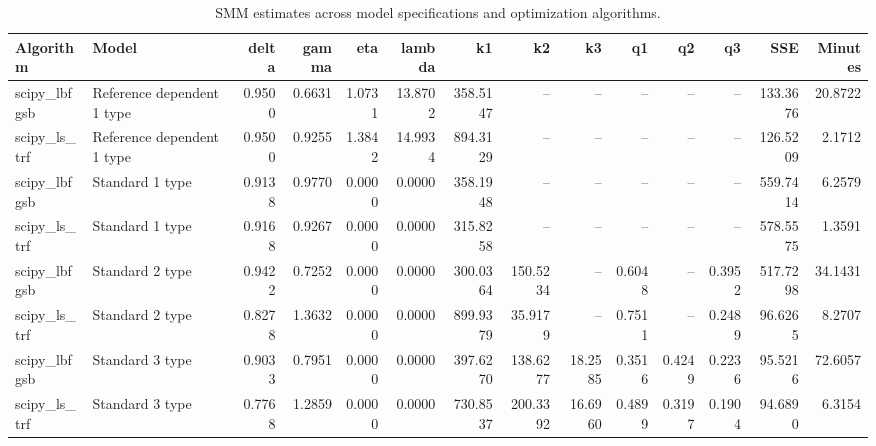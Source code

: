 \begin{table}
\caption{SMM estimates across model specifications and optimization algorithms.}
\label{tab:all_estimates}
\begin{tabular}{llrrrrrrrrrrrr}
\toprule
Algorithm & Model & delta & gamma & eta & lambda & k1 & k2 & k3 & q1 & q2 & q3 & SSE & Minutes \\
\midrule
scipy_lbfgsb & Reference dependent 1 type & 0.9500 & 0.6631 & 1.0731 & 13.8702 & 358.5147 & -- & -- & -- & -- & -- & 133.3676 & 20.8722 \\
scipy_ls_trf & Reference dependent 1 type & 0.9500 & 0.9255 & 1.3842 & 14.9934 & 894.3129 & -- & -- & -- & -- & -- & 126.5209 & 2.1712 \\
scipy_lbfgsb & Standard 1 type & 0.9138 & 0.9770 & 0.0000 & 0.0000 & 358.1948 & -- & -- & -- & -- & -- & 559.7414 & 6.2579 \\
scipy_ls_trf & Standard 1 type & 0.9168 & 0.9267 & 0.0000 & 0.0000 & 315.8258 & -- & -- & -- & -- & -- & 578.5575 & 1.3591 \\
scipy_lbfgsb & Standard 2 type & 0.9422 & 0.7252 & 0.0000 & 0.0000 & 300.0364 & 150.5234 & -- & 0.6048 & -- & 0.3952 & 517.7298 & 34.1431 \\
scipy_ls_trf & Standard 2 type & 0.8278 & 1.3632 & 0.0000 & 0.0000 & 899.9379 & 35.9179 & -- & 0.7511 & -- & 0.2489 & 96.6265 & 8.2707 \\
scipy_lbfgsb & Standard 3 type & 0.9033 & 0.7951 & 0.0000 & 0.0000 & 397.6270 & 138.6277 & 18.2585 & 0.3516 & 0.4249 & 0.2236 & 95.5216 & 72.6057 \\
scipy_ls_trf & Standard 3 type & 0.7768 & 1.2859 & 0.0000 & 0.0000 & 730.8537 & 200.3392 & 16.6960 & 0.4899 & 0.3197 & 0.1904 & 94.6890 & 6.3154 \\
\bottomrule
\end{tabular}
\end{table}
